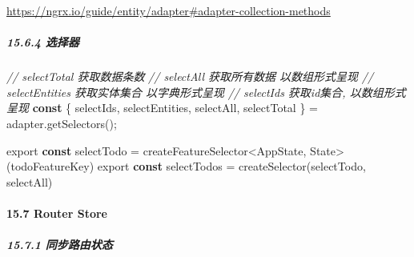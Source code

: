 \documentclass[
]{article}
\newenvironment{Shaded}{}{}
\newcommand{\CommentTok}[1]{\textcolor[rgb]{0.38,0.63,0.69}{\textit{#1}}}
\newcommand{\FunctionTok}[1]{\textcolor[rgb]{0.02,0.16,0.49}{#1}}
\newcommand{\ImportTok}[1]{#1}
\newcommand{\KeywordTok}[1]{\textcolor[rgb]{0.00,0.44,0.13}{\textbf{#1}}}
\newcommand{\NormalTok}[1]{#1}
\newcommand{\OperatorTok}[1]{\textcolor[rgb]{0.40,0.40,0.40}{#1}}
\begin{document}
\url{https://ngrx.io/guide/entity/adapter\#adapter-collection-methods}

\hypertarget{1564-ux9009ux62e9ux5668}{%
\subparagraph{15.6.4 选择器}\label{1564-ux9009ux62e9ux5668}}

\begin{Shaded}
\begin{Highlighting}[]
\CommentTok{// selectTotal 获取数据条数}
\CommentTok{// selectAll 获取所有数据 以数组形式呈现}
\CommentTok{// selectEntities 获取实体集合 以字典形式呈现}
\CommentTok{// selectIds 获取id集合, 以数组形式呈现}
\KeywordTok{const}\NormalTok{ \{ selectIds}\OperatorTok{,}\NormalTok{ selectEntities}\OperatorTok{,}\NormalTok{ selectAll}\OperatorTok{,}\NormalTok{ selectTotal \} }\OperatorTok{=}\NormalTok{ adapter}\OperatorTok{.}\FunctionTok{getSelectors}\NormalTok{()}\OperatorTok{;}
\end{Highlighting}
\end{Shaded}

\begin{Shaded}
\begin{Highlighting}[]
\ImportTok{export} \KeywordTok{const}\NormalTok{ selectTodo }\OperatorTok{=}\NormalTok{ createFeatureSelector}\OperatorTok{\textless{}}\NormalTok{AppState}\OperatorTok{,}\NormalTok{ State}\OperatorTok{\textgreater{}}\NormalTok{(todoFeatureKey)}
\ImportTok{export} \KeywordTok{const}\NormalTok{ selectTodos }\OperatorTok{=} \FunctionTok{createSelector}\NormalTok{(selectTodo}\OperatorTok{,}\NormalTok{ selectAll)}
\end{Highlighting}
\end{Shaded}

\hypertarget{157-router-store}{%
\paragraph{15.7 Router Store}\label{157-router-store}}

\hypertarget{1571-ux540cux6b65ux8defux7531ux72b6ux6001}{%
\subparagraph{15.7.1
同步路由状态}\label{1571-ux540cux6b65ux8defux7531ux72b6ux6001}}
\end{document}
